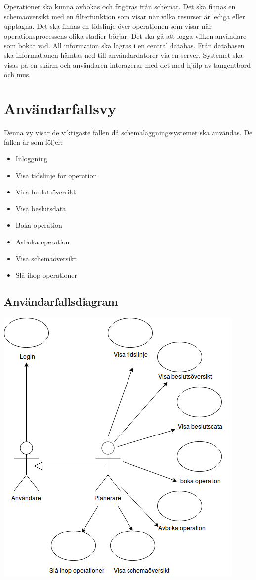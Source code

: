 \documentclass[a4paper,10pt]{article}
\begin{document}
Operationer ska kunna avbokas och frigöras från schemat. Det ska finnas en schemaöversikt med en filterfunktion som visar när vilka resurser är lediga eller upptagna. Det ska finnas en tidslinje över operationen som visar när operationsprocessens olika stadier börjar. Det ska gå att logga vilken användare som bokat vad. All information ska lagras i en central databas. Från databasen ska informationen hämtas ned till användardatorer via en server. Systemet ska visas på en skärm och användaren interagerar med det med hjälp av tangentbord och mus.

\section{Användarfallsvy}

Denna vy visar de viktigaste fallen då schemaläggningssystemet ska användas. De fallen är som följer:
\begin{itemize}
	\item Inloggning
	\item Visa tidslinje för operation
	\item Visa beslutsöversikt
	\item Visa beslutsdata
	\item Boka operation
	\item Avboka operation
	\item Visa schemaöversikt
	\item Slå ihop operationer
\end{itemize}
\subsection{Användarfallsdiagram}
\includegraphics[width=\textwidth,height=\textheight,keepaspectratio]{Usecasediagram.png}
\clearpage
\end{document}
